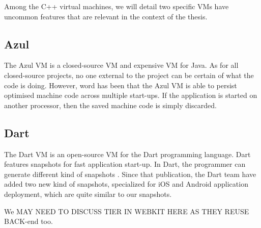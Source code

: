 \documentclass[a4paper,12pt,twoside]{../includes/ThesisStyle}
\begin{document}
Among the C++ virtual machines, we will detail two specific VMs have uncommon features that are relevant in the context of the thesis. 

\subsection{Azul}
The Azul VM \cite{Azul} is a closed-source VM and expensive VM for Java. As for all closed-source projects, no one external to the project can be certain of what the code is doing. However, word has been that the Azul VM is able to persist optimised machine code across multiple start-ups. If the application is started on another processor, then the saved machine code is simply discarded. 

\subsection{Dart}
The Dart VM is an open-source VM for the Dart programming language. Dart features snapshots for fast application start-up. In Dart, the programmer can generate different kind of snapshots \cite{Anna13a}. Since that publication, the Dart team have added two new kind of snapshots, specialized for iOS and Android application deployment, which are quite similar to our snapshots.

We MAY NEED TO DISCUSS TIER IN WEBKIT HERE AS THEY REUSE BACK-end too.



\end{document}
